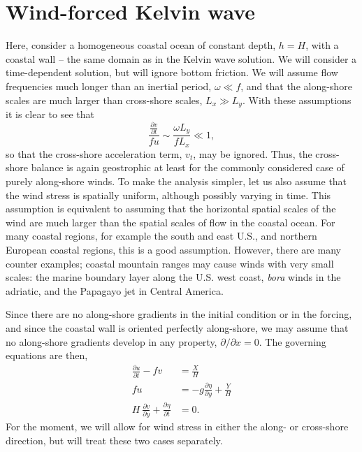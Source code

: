 \documentclass[11pt]{report}
\numberwithin{equation}{section}
\begin{document}
\section{Wind-forced Kelvin wave}

Here, consider a homogeneous coastal ocean of constant depth, $h=H$,  with a coastal wall -- the same domain as in the Kelvin wave solution.  We will consider a time-dependent solution, but will ignore bottom friction.  We will assume flow frequencies much longer than an inertial period, $ \omega \ll f$, and that the along-shore scales are much larger than cross-shore scales, $L_x \gg L_y$.  With these assumptions it is clear to see that
\begin{equation}
    \frac{ \frac{\partial v}{\partial t} }{ f u } \sim \frac{ \omega L_y}{ f L_x } \ll 1,
\end{equation}
so that the cross-shore acceleration term, $v_t$, may be ignored.  Thus, the cross-shore balance is again geostrophic at least for the commonly considered case of purely along-shore winds.  To make the analysis simpler, let us also assume that the wind stress is spatially uniform, although possibly varying in time.  This assumption is equivalent to assuming that the horizontal spatial scales of the wind are much larger than the spatial scales of flow in the coastal ocean.  For many coastal regions, for example the south and east U.S., and northern European coastal regions, this is a good assumption.  However, there are many counter examples; coastal mountain ranges may cause winds with very small scales: the marine boundary layer along the U.S. west coast, \emph{bora} winds in the adriatic, and the Papagayo jet in Central America.

Since there are no along-shore gradients in the initial condition or in the forcing, and since the coastal wall is oriented perfectly along-shore, we may assume that no along-shore gradients develop in any property, $\partial / \partial x = 0$.  The governing equations are then,
\begin{align}
\frac{\partial u}{\partial t} - fv &=  \frac{X}{H} \label{eq:u-forced-kelvin} \\
    f u &= -g\frac{\partial \eta}{\partial y} + \frac{Y}{H} \label{eq:v-forced-kelvin} \\
    H\ \frac{\partial v}{\partial y} + \frac{\partial \eta}{\partial t} &= 0. \label{eq:cont-forced-kelvin}    
\end{align}
For the moment, we will allow for wind stress in either the along- or cross-shore direction, but will treat these two cases separately.  
\end{document}
